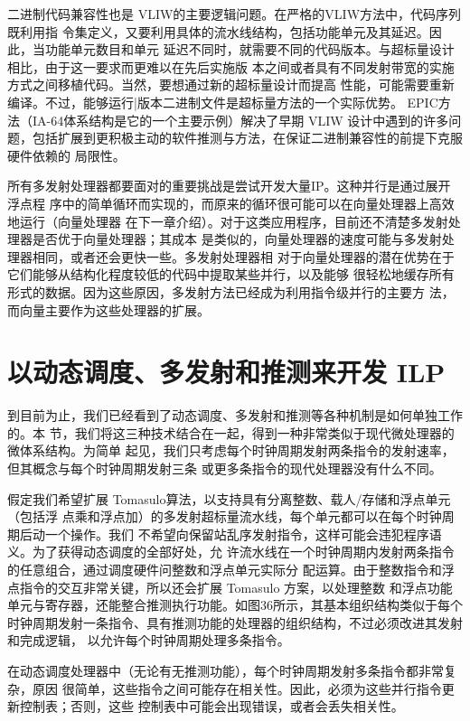 二进制代码兼容性也是 VLIW的主要逻辑问题。在严格的VLIW方法中，代码序列既利用指
令集定义，又要利用具体的流水线结构，包括功能单元及其延迟。因此，当功能单元数目和单元
延迟不同时，就需要不同的代码版本。与超标量设计相比，由于这一要求而更难以在先后实施版
本之间或者具有不同发射带宽的实施方式之间移植代码。当然，要想通过新的超标量设计而提高
性能，可能需要重新编译。不过，能够运行|版本二进制文件是超标量方法的一个实际优势。
EPIC方法（IA-64体系结构是它的一个主要示例）解决了早期 VLIW 设计中遇到的许多问
题，包括扩展到更积极主动的软件推测与方法，在保证二进制兼容性的前提下克服硬件依赖的
局限性。

所有多发射处理器都要面对的重要挑战是尝试开发大量IP。这种并行是通过展开浮点程
序中的简单循环而实现的，而原来的循环很可能可以在向量处理器上高效地运行（向量处理器
在下一章介绍）。对于这类应用程序，目前还不清楚多发射处理器是否优于向量处理器；其成本
是类似的，向量处理器的速度可能与多发射处理器相同，或者还会更快一些。多发射处理器相
对于向量处理器的潜在优势在于它们能够从结构化程度较低的代码中提取某些并行，以及能够
很轻松地缓存所有形式的数据。因为这些原因，多发射方法已经成为利用指令级并行的主要方
法，而向量主要作为这些处理器的扩展。

\section{以动态调度、多发射和推测来开发 ILP}
到目前为止，我们已经看到了动态调度、多发射和推测等各种机制是如何单独工作的。本
节，我们将这三种技术结合在一起，得到一种非常类似于现代微处理器的微体系结构。为简单
起见，我们只考虑每个时钟周期发射两条指令的发射速率，但其概念与每个时钟周期发射三条
或更多条指令的现代处理器没有什么不同。

假定我们希望扩展 Tomasulo算法，以支持具有分离整数、载人/存储和浮点单元（包括浮
点乘和浮点加）的多发射超标量流水线，每个单元都可以在每个时钟周期后动一个操作。我们
不希望向保留站乱序发射指令，这样可能会违犯程序语义。为了获得动态调度的全部好处，允
许流水线在一个时钟周期内发射两条指令的任意组合，通过调度硬件问整数和浮点单元实际分
配运算。由于整数指令和浮点指令的交互非常关键，所以还会扩展 Tomasulo 方案，以处理整数
和浮点功能单元与寄存器，还能整合推测执行功能。如图36所示，其基本组织结构类似于每个
时钟周期发射一条指令、具有推测功能的处理器的组织结构，不过必须改进其发射和完成逻辑，
以允许每个时钟周期处理多条指令。

在动态调度处理器中（无论有无推测功能），每个时钟周期发射多条指令都非常复杂，原因
很简单，这些指令之间可能存在相关性。因此，必须为这些并行指令更新控制表；否则，这些
控制表中可能会出现错误，或者会丢失相关性。

